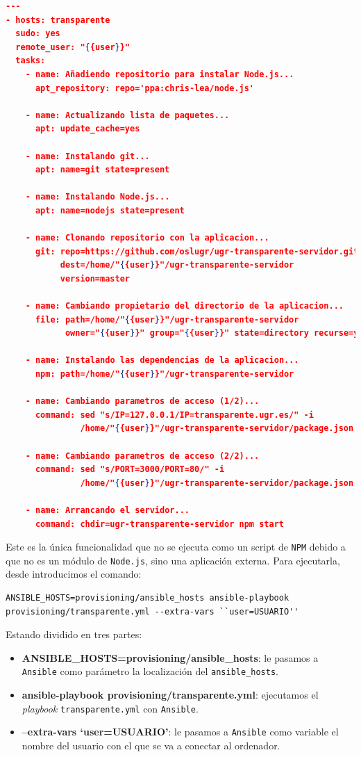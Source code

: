 \begin{lstlisting}[language=json,caption={Playbook de Ansible},label={lst:ansible}]
---
- hosts: transparente
  sudo: yes
  remote_user: "{{user}}"
  tasks:
    - name: Añadiendo repositorio para instalar Node.js...
      apt_repository: repo='ppa:chris-lea/node.js'

    - name: Actualizando lista de paquetes...
      apt: update_cache=yes

    - name: Instalando git...
      apt: name=git state=present

    - name: Instalando Node.js...
      apt: name=nodejs state=present

    - name: Clonando repositorio con la aplicacion...
      git: repo=https://github.com/oslugr/ugr-transparente-servidor.git
           dest=/home/"{{user}}"/ugr-transparente-servidor
           version=master

    - name: Cambiando propietario del directorio de la aplicacion...
      file: path=/home/"{{user}}"/ugr-transparente-servidor
            owner="{{user}}" group="{{user}}" state=directory recurse=yes

    - name: Instalando las dependencias de la aplicacion...
      npm: path=/home/"{{user}}"/ugr-transparente-servidor

    - name: Cambiando parametros de acceso (1/2)...
      command: sed "s/IP=127.0.0.1/IP=transparente.ugr.es/" -i
               /home/"{{user}}"/ugr-transparente-servidor/package.json

    - name: Cambiando parametros de acceso (2/2)...
      command: sed "s/PORT=3000/PORT=80/" -i
               /home/"{{user}}"/ugr-transparente-servidor/package.json

    - name: Arrancando el servidor...
      command: chdir=ugr-transparente-servidor npm start
\end{lstlisting}

Este es la única funcionalidad que no se ejecuta como un script de {\tt NPM} debido a que no es un módulo de {\tt Node.js}, sino una aplicación externa. Para ejecutarla, desde introducimos el comando:

\begin{lstlisting}[language=consola,caption={Línea de comando de Ansible},label={lst:ejec_ansible}]
ANSIBLE_HOSTS=provisioning/ansible_hosts ansible-playbook provisioning/transparente.yml --extra-vars ``user=USUARIO''
\end{lstlisting}

\bigskip
Estando dividido en tres partes:

\begin{itemize}
	\item \textbf{ANSIBLE\_HOSTS=provisioning/ansible\_hosts}: le pasamos a {\tt Ansible} como parámetro la localización del {\tt ansible\_hosts}.
	\item \textbf{ansible-playbook provisioning/transparente.yml}: ejecutamos el \textit{playbook} {\tt transparente.yml} con {\tt Ansible}.
	\item \textbf{--extra-vars `user=USUARIO'}: le pasamos a {\tt Ansible} como variable el nombre del usuario con el que se va a conectar al ordenador.
\end{itemize}
